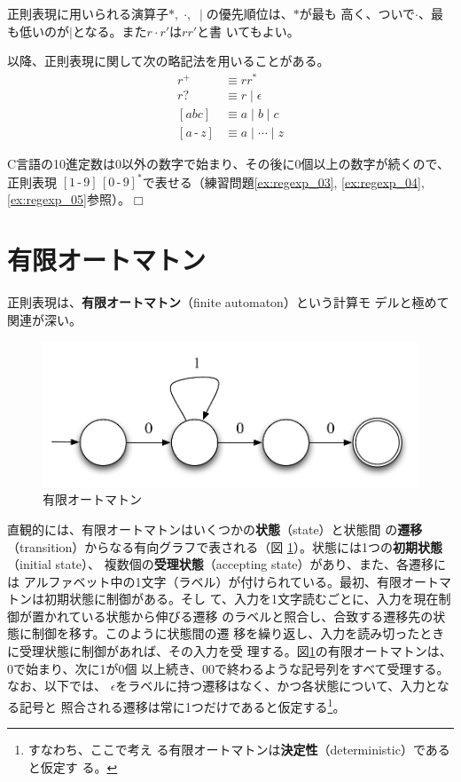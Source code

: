 正則表現に用いられる演算子$\ast,\;\cdot,\;\mid$の優先順位は、$\ast$が最も
高く、ついで$\cdot$、最も低いのが$\mid$となる。また$r\cdot r'$は$rr'$と書
いてもよい。

以降、正則表現に関して次の略記法を用いることがある。
\begin{align*}
 r^+ & \equiv rr^\ast \\
 r? & \equiv r \mid \epsilon \\
 [abc] & \equiv a \mid b \mid c \\
 [a\,\mbox{-}\,z] & \equiv a \mid \cdots \mid z
\end{align*}

\begin{example}
 C言語の10進定数は0以外の数字で始まり、その後に0個以上の数字が続くので、正則表現
$[1\,\mbox{-}\,9]\,[0\,\mbox{-}\,9]^\ast$で表せる（練習問題\ref{ex:regexp_03},
\ref{ex:regexp_04}, \ref{ex:regexp_05}参照）。$\Box$
\end{example}

\section{有限オートマトン}

正則表現は、{\bfseries 有限オートマトン}（finite automaton）という計算モ
デルと極めて関連が深い。

\begin{figure}
 \begin{center}
  \includegraphics[width=12cm]{figure/finite_automaton.pdf}
 \end{center}
 \caption{有限オートマトン}
 \label{162900_30Mar06}
\end{figure}

直観的には、有限オートマトンはいくつかの{\bfseries 状態}（state）と状態間
の{\bfseries 遷移}（transition）からなる有向グラフで表される（図
\ref{162900_30Mar06}）。状態には1つの{\bfseries 初期状態}（initial state）、
複数個の{\bfseries 受理状態}（accepting state）があり、また、各遷移には
アルファベット中の1文字（ラベル）が付けられている。最初、有限オートマトンは初期状態に制御がある。そし
て、入力を1文字読むごとに、入力を現在制御が置かれている状態から伸びる遷移
のラベルと照合し、合致する遷移先の状態に制御を移す。このように状態間の遷
移を繰り返し、入力を読み切ったときに受理状態に制御があれば、その入力を受
理する。図\ref{162900_30Mar06}の有限オートマトンは、0で始まり、次に1が0個
以上続き、00で終わるような記号列をすべて受理する。なお、以下では、
$\epsilon$をラベルに持つ遷移はなく、かつ各状態について、入力となる記号と
照合される遷移は常に1つだけであると仮定する\footnote{すなわち、ここで考え
る有限オートマトンは{\bfseries 決定性}（deterministic）であると仮定す
る。}。


